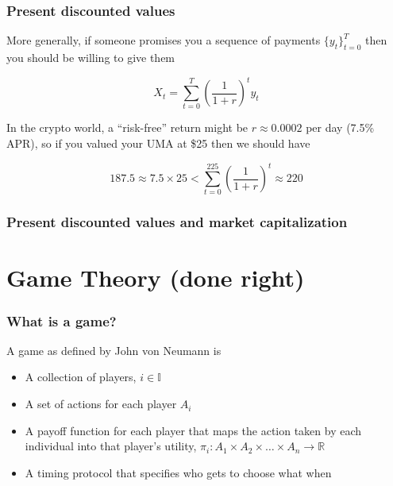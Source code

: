\documentclass[10pt]{beamer}
\begin{document}
  \begin{frame} \frametitle{Present discounted values}

    More generally, if someone promises you a sequence of payments $\{y_{t}\}_{t=0}^{T}$ then you
    should be willing to give them

    $$X_{t} = \sum_{t=0}^{T} \left(\frac{1}{1 + r}\right)^{t} y_{t}$$

    In the crypto world, a ``risk-free'' return might be $r \approx 0.0002$ per day (7.5\% APR), so
    if you valued your UMA at \$25 then we should have

    $$187.5 \approx 7.5 \times 25 < \sum_{t=0}^{225} \left(\frac{1}{1+r}\right)^{t} \approx 220$$

  \end{frame}

  \begin{frame} \frametitle{Present discounted values and market capitalization}

  \end{frame}


\section{Game Theory (done right)}

  \begin{frame} \frametitle{What is a game?}

    A game as defined by John von Neumann is

    \begin{itemize}

      \item A collection of players, $i \in \mathbb{I}$
      \item A set of actions for each player $A_i$
      \item A payoff function for each player that maps the action taken by each individual into
            that player's utility,
            $\pi_i : A_1 \times A_2 \times \dots \times A_n \rightarrow \mathbb{R}$
      \item A timing protocol that specifies who gets to choose what when
    \end{itemize}


  \end{frame}
\end{document}
